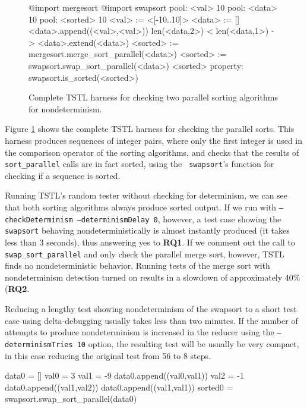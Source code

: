 \begin{figure}
{\scriptsize
\begin{code}
@import mergesort
@import swapsort
\vspace{0.1in}
pool: <val> 10
pool: <data> 10
pool: <sorted> 10
\vspace{0.1in}
<val> := <[-10..10]>
\vspace{0.1in}
<data> := []
<data>.append((<val>,<val>))
len(<data,2>) < len(<data,1>) -> <data>.extend(<data>)
\vspace{0.1in}
<sorted> := mergesort.merge\_sort\_parallel(<data>)
<sorted> := swapsort.swap\_sort\_parallel(<data>)
<sorted>
\vspace{0.1in}
property: swapsort.is\_sorted(<sorted>)
\end{code}
}
\caption {Complete TSTL harness for checking two parallel sorting
  algorithms for nondeterminism.}
\label{fig:parallelcode}
\end{figure}

Figure \ref{fig:parallelcode} shows the complete TSTL harness for
checking the parallel sorts.  This harness produces sequences of
integer pairs, where only the first integer is used in the comparison
operator of the sorting algorithms, and checks that the results of
{\tt sort\_parallel} calls are in fact sorted, using the {\tt
  swapsort}'s function for checking if a sequence is sorted.

Running TSTL's random tester without checking for determinism, we can
see that both sorting algorithms always produce sorted output.  If we run with {\tt --checkDeterminism --determinismDelay 0}, however, a
test case showing the {\tt swapsort} behaving nondeterministically is
almost instantly produced (it takes less than 3 seconds), thus
answering yes to {\bf  RQ1}.  If we comment out the call to {\tt
  swap\_sort\_parallel} and only check the parallel merge sort, however, TSTL
finds no nondeterministic behavior.  Running tests of the merge sort
with nondeterminism detection turned on results in a slowdown of approximately
40\% ({\bf RQ2}.

Reducing a lengthy test showing nondeterminism of the swapsort to a
short test case using delta-debugging usually takes less than two
minutes.  If the number of attempts to produce nondeterminism is
increased in the reducer using the {\tt --determinismTries 10} option,
the resulting test will be usually be very compact, in this case
reducing the original test from 56 to 8 steps.

{\scriptsize
\begin{code}
data0 = []    
val0 = 3      
val1 = -9    
data0.append((val0,val1)) 
val2 = -1                         
data0.append((val1,val2))
data0.append((val1,val1))  
sorted0 = swapsort.swap\_sort\_parallel(data0)      
\end{code}
}

